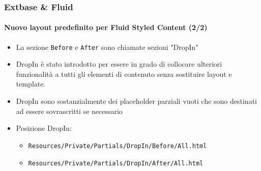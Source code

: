 
\begin{frame}[fragile]
	\frametitle{Extbase \& Fluid}
	\framesubtitle{Nuovo layout predefinito per Fluid Styled Content (2/2)}

	\begin{itemize}
		\item La sezione \texttt{Before} e \texttt{After} sono chiamate sezioni "DropIn"
		\item DropIn è stato introdotto per essere in grado di collocare ulteriori funzionalità a tutti gli
			elementi di contenuto senza sostituire layout e template.
		\item DropIn sono sostanzialmente dei placeholder parziali vuoti che sono destinati ad essere sovrascritti se necessario
		\item Posizione DropIn:
			\begin{itemize}
				\item \texttt{Resources/Private/Partials/DropIn/Before/All.html}
				\item \texttt{Resources/Private/Partials/DropIn/After/All.html}
			\end{itemize}
	\end{itemize}

\end{frame}

